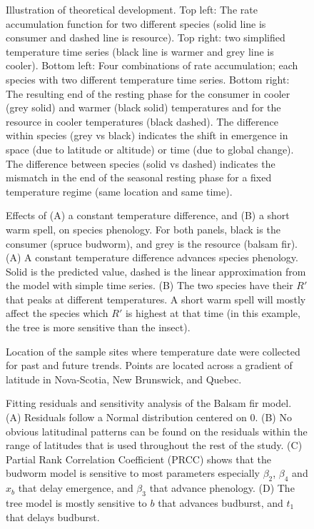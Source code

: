 \documentclass[12 pt]{article}
\begin{document}
\clearpage

\begin{figure}
    \centering
    \caption{Illustration of theoretical development. Top left: The rate accumulation function for two different species (solid line is consumer and dashed line is resource). Top right: two simplified temperature time series (black line is warmer and grey line is cooler). Bottom left: Four combinations of rate accumulation; each species with two different temperature time series. Bottom right: The resulting end of the resting phase for the consumer in cooler (grey solid) and warmer (black solid) temperatures and for the resource in cooler temperatures (black dashed). The difference within species (grey vs black) indicates the shift in emergence in space (due to latitude or altitude) or time (due to global change). The difference between species (solid vs dashed) indicates the mismatch in the end of the seasonal resting phase for a fixed temperature regime (same location and same time).}
    \label{fig:generaltheory}
\end{figure}

\begin{figure}
    \centering
    \caption{Effects of (A) a constant temperature difference, and (B) a short warm spell, on species phenology. For both panels, black is the consumer (spruce budworm), and grey is the resource (balsam fir). (A) A constant temperature difference advances species phenology. Solid is the predicted value, dashed is the linear approximation from the model with simple time series. (B) The two species have their $R'$ that peaks at different temperatures. A short warm spell will mostly affect the species which $R'$ is highest at that time (in this example, the tree is more sensitive than the insect).}
\end{figure}

\begin{figure}
    \centering
    \caption{Location of the sample sites where temperature date were collected for past and future trends. Points are located across a gradient of latitude in Nova-Scotia, New Brunswick, and Quebec.}
    \label{fig:map}
\end{figure}

\begin{figure}
    \centering
    \caption{Fitting residuals and sensitivity analysis of the Balsam fir model. (A) Residuals follow a Normal distribution centered on $0$. (B) No obvious latitudinal patterns can be found on the residuals within the range of latitudes that is used throughout the rest of the study. (C) Partial Rank Correlation Coefficient (PRCC) shows that the budworm model is sensitive to most parameters especially $\beta _2$, $\beta _4$ and $x_b$ that delay emergence, and $\beta _3$ that advance phenology. (D) The tree model is mostly sensitive to $b$ that advances budburst, and $t_1$ that delays budburst.}
\end{figure}
\end{document}
